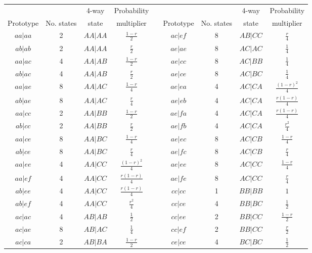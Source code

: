 \documentclass[9pt,letterpaper,twoside]{article}
\begin{document}
{
\begin{center}\begin{tabular}{ccccccccc}\cline{1-4} \cline{6-9}
          &            & 4-way & Probability & &
          &            & 4-way & Probability \\[-6pt] 
Prototype & No. states & state & multiplier & \hspace{10mm} &
Prototype & No. states & state & multiplier \\ \cline{1-4} \cline{6-9}
$aa|aa$ & 2 & $AA|AA$ & $\frac{1-r}{2}$ &&
$ac|ef$ & 8 & $AB|CC$ & $\frac{r}{4}$ \\ 
$ab|ab$ & 2 & $AA|AA$ & $\frac{r}{2}$ &&
$ae|ae$ & 8 & $AC|AC$ & $\frac{1}{4}$ \\ 
$aa|ac$ & 4 & $AA|AB$ & $\frac{1-r}{2}$ &&
$ae|cc$ & 8 & $AC|BB$ & $\frac{1}{4}$ \\ 
$ab|ac$ & 4 & $AA|AB$ & $\frac{r}{2}$ &&
$ae|ce$ & 8 & $AC|BC$ & $\frac{1}{4}$ \\ 
$aa|ae$ & 8 & $AA|AC$ & $\frac{1-r}{4}$ &&
$ae|ea$ & 4 & $AC|CA$ & $\frac{(1-r)^2}{4}$ \\ 
$ab|ae$ & 8 & $AA|AC$ & $\frac{r}{4}$ &&
$ae|eb$ & 4 & $AC|CA$ & $\frac{r(1-r)}{4}$ \\ 
$aa|cc$ & 2 & $AA|BB$ & $\frac{1-r}{2}$ &&
$ae|fa$ & 4 & $AC|CA$ & $\frac{r(1-r)}{4}$ \\ 
$ab|cc$ & 2 & $AA|BB$ & $\frac{r}{2}$ &&
$ae|fb$ & 4 & $AC|CA$ & $\frac{r^2}{4}$ \\ 
$aa|ce$ & 8 & $AA|BC$ & $\frac{1-r}{4}$ &&
$ae|ec$ & 8 & $AC|CB$ & $\frac{1-r}{4}$ \\ 
$ab|ce$ & 8 & $AA|BC$ & $\frac{r}{4}$ &&
$ae|fc$ & 8 & $AC|CB$ & $\frac{r}{4}$ \\ 
$aa|ee$ & 4 & $AA|CC$ & $\frac{(1-r)^2}{4}$ &&
$ae|ee$ & 8 & $AC|CC$ & $\frac{1-r}{4}$ \\ 
$aa|ef$ & 4 & $AA|CC$ & $\frac{r(1-r)}{4}$ &&
$ae|fe$ & 8 & $AC|CC$ & $\frac{r}{4}$ \\ 
$ab|ee$ & 4 & $AA|CC$ & $\frac{r(1-r)}{4}$ &&
$cc|cc$ & 1 & $BB|BB$ & $1$ \\ 
$ab|ef$ & 4 & $AA|CC$ & $\frac{r^2}{4}$ &&
$cc|ce$ & 4 & $BB|BC$ & $\frac{1}{2}$ \\ 
$ac|ac$ & 4 & $AB|AB$ & $\frac{1}{2}$ &&
$cc|ee$ & 2 & $BB|CC$ & $\frac{1-r}{2}$ \\ 
$ac|ae$ & 8 & $AB|AC$ & $\frac{1}{4}$ &&
$cc|ef$ & 2 & $BB|CC$ & $\frac{r}{2}$ \\ 
$ac|ca$ & 2 & $AB|BA$ & $\frac{1-r}{2}$ &&
$ce|ce$ & 4 & $BC|BC$ & $\frac{1}{2}$ \\ 

\end{tabular}
\end{center}}
\end{document}
